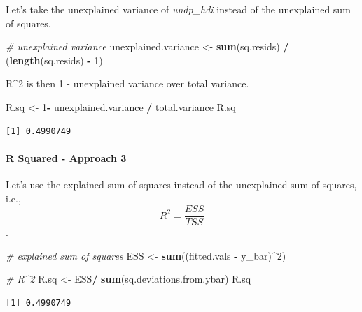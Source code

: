 \documentclass[]{article}
\newenvironment{Shaded}{\begin{snugshade}}{\end{snugshade}}
\newcommand{\KeywordTok}[1]{\textcolor[rgb]{0.13,0.29,0.53}{\textbf{#1}}}
\newcommand{\DecValTok}[1]{\textcolor[rgb]{0.00,0.00,0.81}{#1}}
\newcommand{\StringTok}[1]{\textcolor[rgb]{0.31,0.60,0.02}{#1}}
\newcommand{\CommentTok}[1]{\textcolor[rgb]{0.56,0.35,0.01}{\textit{#1}}}
\newcommand{\OperatorTok}[1]{\textcolor[rgb]{0.81,0.36,0.00}{\textbf{#1}}}
\newcommand{\NormalTok}[1]{#1}
\let\oldparagraph\paragraph
\renewcommand{\paragraph}[1]{\oldparagraph{#1}\mbox{}}
\theoremstyle{definition}
\theoremstyle{definition}
\theoremstyle{definition}
\theoremstyle{remark}
\begin{document}
Let's take the unexplained variance of \emph{undp\_hdi} instead of the
unexplained sum of squares.

\begin{Shaded}
\begin{Highlighting}[]
\CommentTok{# unexplained variance}
\NormalTok{unexplained.variance <-}\StringTok{ }\KeywordTok{sum}\NormalTok{(sq.resids) }\OperatorTok{/}\StringTok{ }\NormalTok{(}\KeywordTok{length}\NormalTok{(sq.resids) }\OperatorTok{-}\StringTok{ }\DecValTok{1}\NormalTok{)}
\end{Highlighting}
\end{Shaded}

R\^{}2 is then 1 - unexplained variance over total variance.

\begin{Shaded}
\begin{Highlighting}[]
\NormalTok{R.sq <-}\StringTok{ }\DecValTok{1}\OperatorTok{-}\StringTok{ }\NormalTok{unexplained.variance }\OperatorTok{/}\StringTok{ }\NormalTok{total.variance}
\NormalTok{R.sq}
\end{Highlighting}
\end{Shaded}

\begin{verbatim}
[1] 0.4990749
\end{verbatim}

\paragraph{R Squared - Approach 3}\label{r-squared---approach-3}

Let's use the explained sum of squares instead of the unexplained sum of
squares, i.e., \[R^2 = \frac{ESS}{TSS}\].

\begin{Shaded}
\begin{Highlighting}[]
\CommentTok{# explained sum of squares}
\NormalTok{ESS <-}\StringTok{ }\KeywordTok{sum}\NormalTok{((fitted.vals }\OperatorTok{-}\StringTok{ }\NormalTok{y_bar)}\OperatorTok{^}\DecValTok{2}\NormalTok{)}

\CommentTok{# R^2}
\NormalTok{R.sq <-}\StringTok{ }\NormalTok{ESS}\OperatorTok{/}\StringTok{ }\KeywordTok{sum}\NormalTok{(sq.deviations.from.ybar)}
\NormalTok{R.sq}
\end{Highlighting}
\end{Shaded}

\begin{verbatim}
[1] 0.4990749
\end{verbatim}
\end{document}
